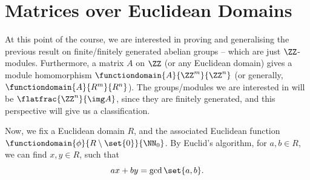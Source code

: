\section{Matrices over Euclidean Domains}

At this point of the course, we are interested in proving and generalising the previous result on finite/finitely generated abelian groups -- which are just \(\ZZ\)-modules. Furthermore, a matrix \(A\) on \(\ZZ\) (or any Euclidean domain) gives a module homomorphism \(\functiondomain{A}{\ZZ^m}{\ZZ^n}\) (or generally, \(\functiondomain{A}{R^m}{R^n}\)). The groups/modules we are interested in will be \(\flatfrac{\ZZ^n}{\img A}\), since they are finitely generated, and this perspective will give us a classification.

Now, we fix a Euclidean domain \(R\), and the associated Euclidean function \(\functiondomain{\phi}{R \setminus \set{0}}{\NN_0}\). By Euclid's algorithm, for \(a, b \in R\), we can find \(x, y \in R\), such that
\[
    ax + by = \gcd\set{a, b}.
\]

\setcounter{MaxMatrixCols}{20}

